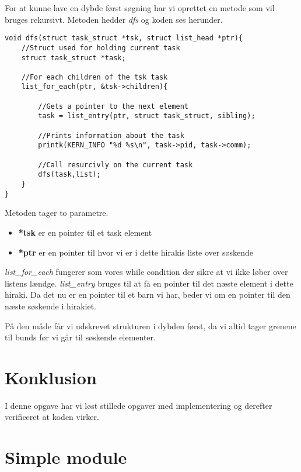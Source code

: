 \documentclass[danish]{report}
\begin{document}
For at kunne lave en dybde først søgning har vi oprettet en metode som vil bruges rekursivt. Metoden hedder \textit{dfs} og koden ses herunder.

\begin{lstlisting}
void dfs(struct task_struct *tsk, struct list_head *ptr){
	//Struct used for holding current task
	struct task_struct *task;
	
	//For each children of the tsk task
	list_for_each(ptr, &tsk->children){ 
	
		//Gets a pointer to the next element
		task = list_entry(ptr, struct task_struct, sibling); 
		
		//Prints information about the task
		printk(KERN_INFO "%d %s\n", task->pid, task->comm);
		
		//Call resurcivly on the current task
		dfs(task,list);
	}
}
\end{lstlisting}

Metoden tager to parametre.

\begin{itemize}
	\item \textbf{*tsk} er en pointer til et task element
	\item \textbf{*ptr} er en pointer til hvor vi er i dette hirakis liste over søskende
\end{itemize}

\textit{list\_for\_each} fungerer som vores while condition der sikre at vi ikke løber over listens lændge. \textit{list\_entry} bruges til at få en pointer til det næste element i dette hiraki. Da det nu er en pointer til et barn vi har, beder vi om en pointer til den næste søskende i hirakiet.

På den måde får vi udskrevet strukturen i dybden først, da vi altid tager grenene til bunds før vi går til søskende elementer.




\chapter{Konklusion}
I denne opgave har vi løst stillede opgaver med implementering og derefter verificeret at koden virker.

\appendix
\chapter{Simple module}
\label{simple.c}
\end{document}
